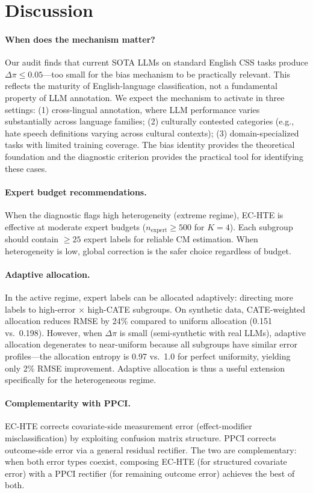 \documentclass[11pt,a4paper]{article}
\begin{document}
\section{Discussion}

\paragraph{When does the mechanism matter?}
Our audit finds that current SOTA LLMs on standard English CSS tasks produce $\Delta\pi \leq 0.05$---too small for the bias mechanism to be practically relevant.
This reflects the maturity of English-language classification, not a fundamental property of LLM annotation.
We expect the mechanism to activate in three settings: (1) cross-lingual annotation, where LLM performance varies substantially across language families; (2) culturally contested categories (e.g., hate speech definitions varying across cultural contexts); (3) domain-specialized tasks with limited training coverage.
The bias identity provides the theoretical foundation and the diagnostic criterion provides the practical tool for identifying these cases.

\paragraph{Expert budget recommendations.}
When the diagnostic flags high heterogeneity (extreme regime), EC-HTE is effective at moderate expert budgets ($n_{\text{expert}} \geq 500$ for $K=4$).
Each subgroup should contain $\geq 25$ expert labels for reliable CM estimation.
When heterogeneity is low, global correction is the safer choice regardless of budget.

\paragraph{Adaptive allocation.}
In the active regime, expert labels can be allocated adaptively: directing more labels to high-error $\times$ high-CATE subgroups.
On synthetic data, CATE-weighted allocation reduces RMSE by 24\% compared to uniform allocation (0.151 vs.\ 0.198).
However, when $\Delta\pi$ is small (semi-synthetic with real LLMs), adaptive allocation degenerates to near-uniform because all subgroups have similar error profiles---the allocation entropy is 0.97 vs.\ 1.0 for perfect uniformity, yielding only 2\% RMSE improvement.
Adaptive allocation is thus a useful extension specifically for the heterogeneous regime.

\paragraph{Complementarity with PPCI.}
EC-HTE corrects covariate-side measurement error (effect-modifier misclassification) by exploiting confusion matrix structure.
PPCI \cite{sui2026ppci} corrects outcome-side error via a general residual rectifier.
The two are complementary: when both error types coexist, composing EC-HTE (for structured covariate error) with a PPCI rectifier (for remaining outcome error) achieves the best of both.
\end{document}
